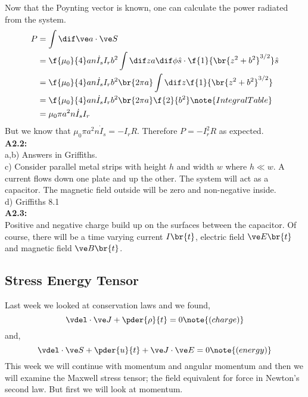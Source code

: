 \documentclass{article}
\begin{document}
Now that the Poynting vector is known, one can calculate the power radiated from the system.
\begin{align*}
P &= \int \dif \ve a \cdot \ve S \\
&= \f{\mu_0}{4} a n \dot I_s I_r b^2 \int \dif z a \dif \phi \hat s \cdot \f{1}{\br{z^2 + b^2}^{3/2}} \hat{s} \\
&= \f{\mu_0}{4} a n \dot I_s I_r b^2 \br{2 \pi a} \int \dif z \f{1}{\br{z^2 + b^2}^{3/2}} \\
&= \f{\mu_0}{4} a n \dot I_s I_r b^2 \br{2 \pi a} \f{2}{b^2} \note{Integral Table} \\
&= \mu_0 \pi a^2 n \dot I_s I_r
\end{align*}
But we know that $\mu_0 \pi a^2 n \dot I_s = - I_r R$. Therefore $P = - I_r^2 R$ as expected.\\
\textbf{A2.2:}\\
a,b) Answers in Griffiths. \\
c) Consider parallel metal strips with height $h$ and width $w$ where $h \ll w$. A current flows down one plate and up the other. The system will act as a capacitor. The magnetic field outside will be zero and non-negative inside. \\
d) Griffiths 8.1 \\
\textbf{A2.3:}\\
Positive and negative charge build up on the surfaces between the capacitor. Of course, there will be a time varying current $I\br{t}$, electric field $\ve E \br{t}$ and magnetic field $\ve B \br{t}$.

\subsection{Stress Energy Tensor}

Last week we looked at conservation laws and we found,
\[ \vdel \cdot \ve J + \pder{\rho}{t} = 0 \note{(charge)} \]
and,
\[ \vdel \cdot \ve S + \pder{u}{t} + \ve J \cdot \ve E = 0 \note{(energy)} \]
This week we will continue with momentum and angular momentum and then we will examine the Maxwell stress tensor; the field equivalent for force in Newton's second law. But first we will look at momentum.
\end{document}
